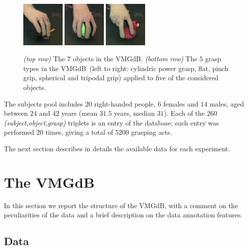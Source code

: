 \documentclass{article}
\newcommand{\db}{\textsf{VMGdB}}
\begin{document}
\begin{figure}[!ht]
	\includegraphics[width=0.19\textwidth]{images/pinch}
	\includegraphics[width=0.19\textwidth]{images/spherical}
	\includegraphics[width=0.19\textwidth]{images/tripodal}
	\caption{{\em (top row)} The $7$ objects in the \db.
         {\em (bottom row)} The $5$ grasp types in the \db\ (left to right: cylindric power
         grasp, flat, pinch grip, spherical and tripodal grip) applied to five
         of the considered objects.}
	\label{fig::grasps}
\end{figure}

The subjects pool includes $20$ right-handed people, $6$ females and $14$ males,
aged between $24$ and $42$ years (mean $31.5$ years, median $31$).
Each of the $260$ {\em (subject,object,grasp)} triplets is an entry of the database;
each entry was performed $20$ times, giving a total of $5200$ grasping acts.

The next section describes in details the available data for each experiment.

\section{The \db}

In this section we report the structure of the \db, with a comment on the
peculiarities of the data and a brief description on the data annotation features.

\subsection{Data}
\end{document}
